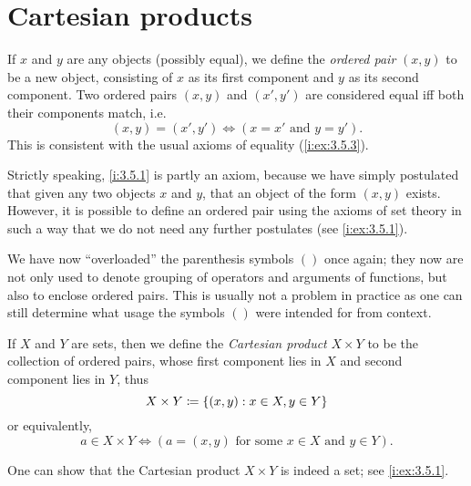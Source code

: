 \section{Cartesian products}\label{i:sec:3.5}

\begin{defn}\label{i:3.5.1}
  If \(x\) and \(y\) are any objects (possibly equal), we define the \emph{ordered pair} \((x, y)\) to be a new object, consisting of \(x\) as its first component and \(y\) as its second component.
  Two ordered pairs \((x, y)\) and \((x', y')\) are considered equal iff both their components match, i.e.
  \[
    (x, y) = (x', y') \iff (x = x' \text{ and } y = y').
  \]
  This is consistent with the usual axioms of equality (\cref{i:ex:3.5.3}).
\end{defn}

\begin{rmk}\label{i:3.5.2}
  Strictly speaking, \cref{i:3.5.1} is partly an axiom, because we have simply postulated that given any two objects \(x\) and \(y\), that an object of the form \((x, y)\) exists.
  However, it is possible to define an ordered pair using the axioms of set theory in such a way that we do not need any further postulates (see \cref{i:ex:3.5.1}).
\end{rmk}

\begin{rmk}\label{i:3.5.3}
  We have now ``overloaded'' the parenthesis symbols \(()\) once again;
  they now are not only used to denote grouping of operators and arguments of functions, but also to enclose ordered pairs.
  This is usually not a problem in practice as one can still determine what usage the symbols \(()\) were intended for from context.
\end{rmk}

\begin{defn}\label{i:3.5.4}
  If \(X\) and \(Y\) are sets, then we define the \emph{Cartesian product} \(X \times Y\) to be the collection of ordered pairs, whose first component lies in \(X\) and second component lies in \(Y\), thus
  \[
    X \times Y \coloneqq \left\lbrace(x, y) : x \in X, y \in Y\right\rbrace
  \]
  or equivalently,
  \[
    a \in X \times Y \iff (a = (x, y) \text{ for some } x \in X \text{ and } y \in Y).
  \]
\end{defn}

\begin{rmk}\label{i:3.5.5}
  One can show that the Cartesian product \(X \times Y\) is indeed a set;
  see \cref{i:ex:3.5.1}.
\end{rmk}


